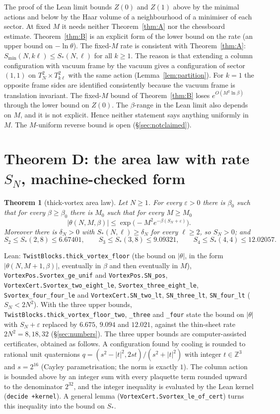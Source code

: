 \documentclass[11pt,a4paper]{article}
\newtheorem{theorem}{Theorem}
\theoremstyle{definition}
\theoremstyle{remark}
\newcommand{\code}[1]{\texttt{#1}}
\begin{document}
The proof of the Lean limit bounds $Z(0)$ and $Z(1)$ above by the minimal actions and below by the Haar volume of a neighbourhood of a minimiser of each sector.
At fixed $M$ it needs neither Theorem~\ref{thm:A} nor the chessboard estimate.
Theorem~\ref{thm:B} is an explicit form of the lower bound on the rate (an upper bound on $-\ln\theta$).
The fixed-$M$ rate is consistent with Theorem~\ref{thm:A}: $S_{\min}(N,k\ell)\le S_*(N,\ell)$ for all $k\ge1$.
The reason is that extending a column configuration with vacuum frame by the vacuum gives a configuration of sector $(1,1)$ on $T^2_N\times T^2_{k\ell}$ with the same action (Lemma~\ref{lem:partition}).
For $k=1$ the opposite frame sides are identified consistently because the vacuum frame is translation invariant.
The fixed-$M$ bound of Theorem~\ref{thm:B} loses $e^{O(M^2\ln\beta)}$ through the lower bound on $Z(0)$.
The $\beta$-range in the Lean limit also depends on $M$, and it is not explicit.
Hence neither statement says anything uniformly in $M$.
The $M$-uniform reverse bound is open (\S\ref{sec:notclaimed}).

\section{Theorem D: the area law with rate $S_N$, machine-checked form}\label{sec:D}

\begin{theorem}[thick-vortex area law]\label{thm:D}
Let $N\ge1$. For every $\varepsilon>0$ there is $\beta_0$ such that for every $\beta\ge\beta_0$ there is $M_0$ such that for every $M\ge M_0$
\[ |\theta(N,M,\beta)|\le\exp\big(-M^2e^{-\beta(S_N+\varepsilon)}\big). \]
Moreover there is $\delta_N>0$ with $S_*(N,\ell)\ge\delta_N$ for every $\ell\ge2$, so $S_N>0$; and
\[ S_2\le S_*(2,8)\le6.67401,\qquad S_3\le S_*(3,8)\le9.09321,\qquad S_4\le S_*(4,4)\le12.02057. \]
\end{theorem}
Lean: \code{TwistBlocks.thick\_vortex\_floor} (the bound on $|\theta|$, in the form $|\theta(N,M{+}1,\beta)|$, eventually in $\beta$ and then eventually in $M$), \code{VortexPos.Svortex\_ge\_unif} and \code{VortexPos.SN\_pos}, \code{VortexCert.Svortex\_two\_eight\_le}, \code{Svortex\_three\_eight\_le}, \code{Svortex\_four\_four\_le} and \code{VortexCert.SN\_two\_lt}, \code{SN\_three\_lt}, \code{SN\_four\_lt} ($S_N<2N^2$). With the three upper bounds, \code{TwistBlocks.thick\_vortex\_floor\_two}, \code{\_three} and \code{\_four} state the bound on $|\theta|$ with $S_N+\varepsilon$ replaced by $6.675$, $9.094$ and $12.021$, against the thin-sheet rate $2N^2=8,18,32$ (\S\ref{sec:numbers}).
The three upper bounds are computer-assisted certificates, obtained as follows.
A configuration found by cooling is rounded to rational unit quaternions $q=(s^2-|t|^2,2st)/(s^2+|t|^2)$ with integer $t\in\mathbb{Z}^3$ and $s=2^{16}$ (Cayley parametrisation; the norm is exactly $1$).
The column action is bounded above by an integer sum with every plaquette term rounded upward to the denominator $2^{32}$, and the integer inequality is evaluated by the Lean kernel (\code{decide +kernel}).
A general lemma (\code{VortexCert.Svortex\_le\_of\_cert}) turns this inequality into the bound on $S_*$.
\end{document}
